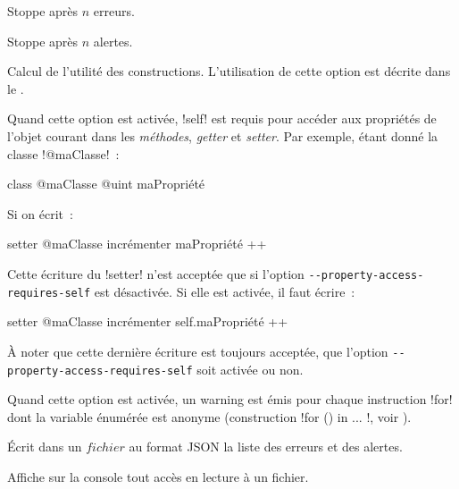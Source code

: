 { Stoppe après $n$ erreurs.

 Stoppe après $n$ alertes.

 Calcul de l'utilité des constructions. L'utilisation de cette option est décrite dans le .



 Quand cette option est activée, \ggst!self! est requis pour accéder aux propriétés de l'objet courant dans les \emph{méthodes}, \emph{getter} et \emph{setter}. Par exemple, étant donné la classe \ggst!@maClasse!~:

\begin{galgas3}
class @maClasse {
  @uint maPropriété
}
\end{galgas3}

Si on écrit~:
\begin{galgas3}
setter @maClasse incrémenter {
  maPropriété ++
}
\end{galgas3}

Cette écriture du \ggst!setter! n'est acceptée que si l'option \texttt{-{-}property-access-requires-self} est désactivée. Si elle est activée, il faut écrire~:
\begin{galgas3}
setter @maClasse incrémenter {
  self.maPropriété ++
}
\end{galgas3}

À noter que cette dernière écriture est toujours acceptée, que l'option \texttt{-{-}property-access-requires-self} soit activée ou non.



 Quand cette option est activée, un warning est émis pour chaque instruction \ggst!for! dont la variable énumérée est anonyme (construction \ggst!for () in ... !, voir ).










 Écrit dans un $fichier$ au format JSON la liste des erreurs et des alertes.


 Affiche sur la console tout accès en lecture à un fichier.


}

